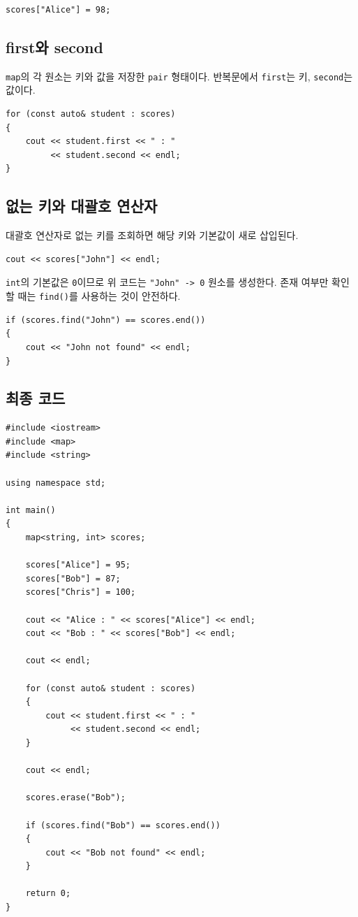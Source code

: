 \documentclass[11pt,a4paper]{article}
\begin{document}
\begin{lstlisting}
scores["Alice"] = 98;
\end{lstlisting}

\subsection{first와 second}
\texttt{map}의 각 원소는 키와 값을 저장한 \texttt{pair} 형태이다. 반복문에서 \texttt{first}는 키, \texttt{second}는 값이다.

\begin{lstlisting}
for (const auto& student : scores)
{
    cout << student.first << " : "
         << student.second << endl;
}
\end{lstlisting}

\subsection{없는 키와 대괄호 연산자}
대괄호 연산자로 없는 키를 조회하면 해당 키와 기본값이 새로 삽입된다.

\begin{lstlisting}
cout << scores["John"] << endl;
\end{lstlisting}

\texttt{int}의 기본값은 \texttt{0}이므로 위 코드는 \texttt{"John" -> 0} 원소를 생성한다. 존재 여부만 확인할 때는 \texttt{find()}를 사용하는 것이 안전하다.

\begin{lstlisting}
if (scores.find("John") == scores.end())
{
    cout << "John not found" << endl;
}
\end{lstlisting}

\subsection{최종 코드}
\begin{lstlisting}
#include <iostream>
#include <map>
#include <string>

using namespace std;

int main()
{
    map<string, int> scores;

    scores["Alice"] = 95;
    scores["Bob"] = 87;
    scores["Chris"] = 100;

    cout << "Alice : " << scores["Alice"] << endl;
    cout << "Bob : " << scores["Bob"] << endl;

    cout << endl;

    for (const auto& student : scores)
    {
        cout << student.first << " : "
             << student.second << endl;
    }

    cout << endl;

    scores.erase("Bob");

    if (scores.find("Bob") == scores.end())
    {
        cout << "Bob not found" << endl;
    }

    return 0;
}
\end{lstlisting}
\end{document}
